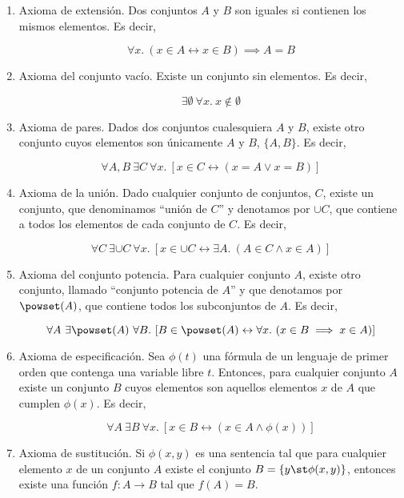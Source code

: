 \begin{enumerate}
  \item Axioma de extensión. Dos conjuntos $A$ y $B$ son iguales si
    contienen los mismos elementos. Es decir, 

    \[ \forall x.\ (x \in A \leftrightarrow x \in B) \implies A = B \]

  \item Axioma del conjunto vacío. Existe un conjunto sin elementos. Es
    decir,

    \[ \exists \emptyset \ \forall x. \ x \notin \emptyset \]

  \item Axioma de pares. Dados dos conjuntos cualesquiera $A$ y $B$, existe
    otro conjunto cuyos elementos son únicamente $A$ y $B$, $\{A, B\}$. Es
    decir,

    \[ \forall A, B \ \exists C \ \forall x. \ [x \in C \leftrightarrow (x =
    A \lor x = B)] \]

  \item Axioma de la unión. Dado cualquier conjunto de conjuntos, $C$,
    existe un conjunto, que denominamos ``unión de $C$'' y denotamos por
    $\cup C$, que contiene a todos los elementos de cada conjunto de $C$. Es
    decir,

    \[ \forall C \ \exists {\cup C} \ \forall x. \ [x \in {\cup C}
    \leftrightarrow \exists A. \ (A \in C \land x \in A)] \]

  \item Axioma del conjunto potencia. Para cualquier conjunto $A$, existe
    otro conjunto, llamado ``conjunto potencia de $A$'' y que denotamos por
    $\powset(A)$, que contiene todos los subconjuntos de $A$. Es decir,

    \[ \forall A \ \exists \powset(A) \ \forall B.\ [B \in \powset(A)
    \leftrightarrow \forall x.\ (x \in B \implies x \in A)] \]

  \item Axioma de especificación. Sea $\phi(t)$ una fórmula de un lenguaje
    de primer orden que contenga una variable libre $t$. Entonces, para
    cualquier conjunto $A$ existe un conjunto $B$ cuyos elementos son
    aquellos elementos $x$ de $A$ que cumplen $\phi(x)$. Es decir,

    \[ \forall A \ \exists B \ \forall x.\ [x \in B \leftrightarrow (x \in A
    \land \phi(x))] \]

  \item Axioma de sustitución. Si $\phi(x, y)$ es una sentencia tal que para
    cualquier elemento $x$ de un conjunto $A$ existe el conjunto $B = \{y
    \st \phi(x, y)\}$, entonces existe una función $f: A \to B$ tal que
    $f(A) = B$.


\end{enumerate}

